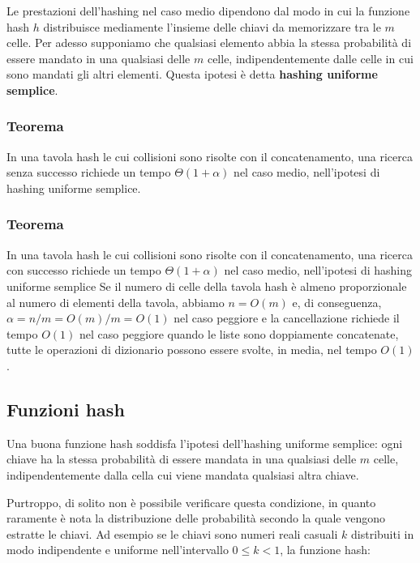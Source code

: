 Le prestazioni dell'hashing nel caso medio dipendono dal modo in cui la funzione hash $h$ distribuisce mediamente l'insieme delle chiavi da memorizzare tra le $m$ celle. Per adesso supponiamo che qualsiasi elemento abbia la stessa probabilità di essere mandato in una qualsiasi delle $m$ celle, indipendentemente dalle celle in cui sono mandati gli altri elementi. Questa ipotesi è detta \textbf{hashing uniforme semplice}.

\subsubsection*{Teorema}

In una tavola hash le cui collisioni sono risolte con il concatenamento, una ricerca senza successo richiede un tempo $\Theta(1+\alpha)$ nel caso medio, nell'ipotesi di hashing uniforme semplice.

\subsubsection*{Teorema}

In una tavola hash le cui collisioni sono risolte con il concatenamento, una ricerca con successo richiede un tempo $\Theta(1+\alpha)$ nel caso medio, nell'ipotesi di hashing uniforme semplice
\linebreak
\linebreak
Se il numero di celle della tavola hash è almeno proporzionale al numero di elementi della tavola, abbiamo $n = O(m)$ e, di conseguenza, $\alpha=n/m=O(m)/m=O(1)$ nel caso peggiore e la cancellazione richiede il tempo $O(1)$ nel caso peggiore quando le liste sono doppiamente concatenate, tutte le operazioni di dizionario possono essere svolte, in media, nel tempo $O(1)$.

\subsection{Funzioni hash}

Una buona funzione hash soddisfa l'ipotesi dell'hashing uniforme semplice: ogni chiave ha la stessa probabilità di essere mandata in una qualsiasi delle $m$ celle, indipendentemente dalla cella cui viene mandata qualsiasi altra chiave.

Purtroppo, di solito non è possibile verificare questa condizione, in quanto raramente è nota la distribuzione delle probabilità secondo la quale vengono estratte le chiavi. Ad esempio se le chiavi sono numeri reali casuali $k$ distribuiti in modo indipendente e uniforme nell'intervallo $0\le k < 1$, la funzione hash:

